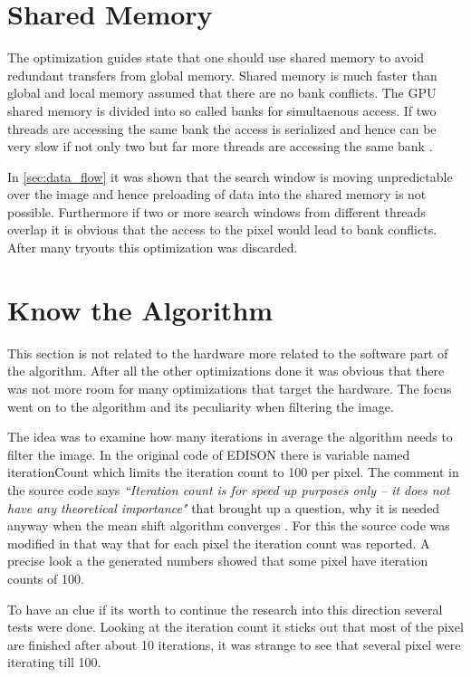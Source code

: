 \section{Shared Memory} %
\label{sec:shared_memory}
The optimization guides state that one should use shared memory to avoid 
redundant transfers from global memory. Shared memory is much faster than global
and local memory assumed that there are no bank conflicts. The \gls{GPU} shared
memory is divided into so called banks for simultaenous access. If two threads
are accessing the same bank the access is serialized and hence can be very slow
if not only two but far more threads are accessing the same bank 
\citep{citeulike:6584051}.

In \autoref{sec:data_flow} it was shown that the search window is moving
unpredictable over the image and hence preloading of data into the shared memory
is not possible. Furthermore if two or more search windows from different
threads overlap it is obvious that the access to the pixel would lead to bank
conflicts. After many tryouts this optimization was discarded. 

\section{Know the Algorithm} %
\label{sec:know_the_algo}
This section is not related to the hardware more related to the software part of 
the algorithm. After all the other optimizations done it was obvious that there
was not more room for many optimizations that target the hardware. The focus went
on to the algorithm and its peculiarity when filtering the image. 

The idea was to examine how many iterations in average the algorithm needs to
filter the image. In the original code of \gls{EDISON} there is variable named
\textsf{iterationCount} which limits the iteration count to 100 per pixel. The
comment in the source code says \textit{``Iteration count is for speed up
purposes only -- it does not have any theoretical importance"} that brought up a
question, why it is needed anyway when the mean shift algorithm converges
\citep{citeulike:462300}. For this the source code was modified in that way
that for each pixel the iteration count was reported. A precise look a the 
generated numbers showed that some pixel have iteration counts of 100. 

To have an clue if its worth to continue the research into this direction several
tests were done. Looking at the iteration count it sticks out that most of the 
pixel are finished after about 10 iterations, it was strange to see that several
pixel were iterating till 100. 

